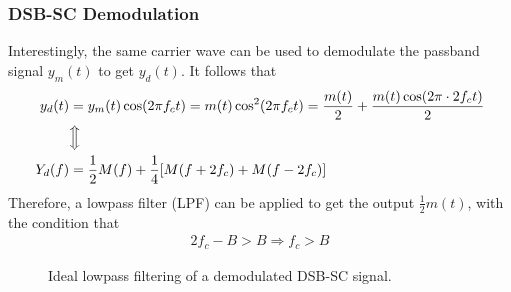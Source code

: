 \documentclass{report}
\begin{document}
\subsubsection{DSB-SC Demodulation}
Interestingly, the same carrier wave can be used to demodulate the passband signal $y_m(t)$ to get $y_d(t)$. It follows that 
\begin{align}
    y_d(t) &= y_m(t)\cos(2\pi f_c t) = m(t)\cos^2(2\pi f_c t) = \frac{m(t)}{2} + \frac{m(t)\cos(2\pi\cdot 2f_c t)}{2} \\
    &\Big\Updownarrow \nonumber \\
    Y_d(f) &= \frac{1}{2}M(f) + \frac{1}{4}[M(f+2f_c) + M(f-2f_c)]
\end{align}
Therefore, a lowpass filter (LPF) can be applied to get the output $\frac{1}{2}m(t)$, with the condition that 
\begin{align}
    2f_c - B > B \Longrightarrow f_c > B
\end{align}
\begin{figure}[!hbt]
    \centering
    \caption{Ideal lowpass filtering of a demodulated DSB-SC signal.}
\end{figure}
\end{document}
